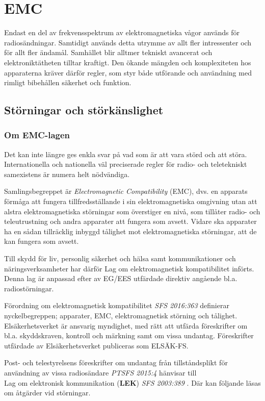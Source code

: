 \chapter{EMC}

Endast en del av frekvensspektrum av elektromagnetiska vågor används för
radiosändningar.
Samtidigt används detta utrymme av allt fler intressenter och för allt fler
ändamål.
Samhället blir alltmer tekniskt avancerat och elektroniktätheten tilltar
kraftigt.
Den ökande mängden och komplexiteten hos apparaterna kräver därför regler, som
styr både utförande och användning med rimligt bibehållen säkerhet och funktion.

\section{Störningar och störkänslighet}

\subsection{Om EMC-lagen}
\label{EMC-lagen}

Det kan inte längre ges enkla svar på vad som är att vara störd och att störa.
Internationella och nationella väl preciserade regler för radio- och
teletekniskt samexistens är numera helt nödvändiga.

Samlingsbegreppet är \emph{Electromagnetic Compatibility} (EMC), dvs. en
apparats förmåga att fungera tillfredsställande i sin elektromagnetiska
omgivning utan att alstra elektromagnetiska störningar som överstiger en nivå,
som tillåter radio- och teleutrustning och andra apparater att fungera som
avsett.
Vidare ska apparater ha en sådan tillräcklig inbyggd tålighet mot
elektromagnetiska störningar, att de kan fungera som avsett.

Till skydd för liv, personlig säkerhet och hälsa samt kommunikationer och
näringsverksamheter har därför Lag om elektromagnetisk kompatibilitet införts.
Denna lag är anpassad efter av EG/EES utfärdade direktiv angående bl.a.
radiostörningar.

Förordning om elektromagnetisk kompatibilitet \emph{SFS 2016:363}
\cite{SFS2016:363} definierar nyckelbegreppen; apparater, EMC, elektromagnetisk
störning och tålighet.
Elsäkerhetsverket är ansvarig myndighet, med rätt att utfärda föreskrifter om
bl.a. skyddskraven, kontroll och märkning samt om vissa undantag.
Föreskrifter utfärdade av Elsäkerhetsverket publiceras som ELSÄK-FS.

Post- och telestyrelsens föreskrifter om undantag från tillståndsplikt för
användning av vissa radiosändare \emph{PTSFS 2015:4} \cite{PTSFS2015:4} hänvisar
till\\
Lag om elektronisk kommunikation (\textbf{LEK}) \emph{SFS 2003:389}
\cite{SFS2003:389}.
Där kan följande läsas om åtgärder vid störningar.


